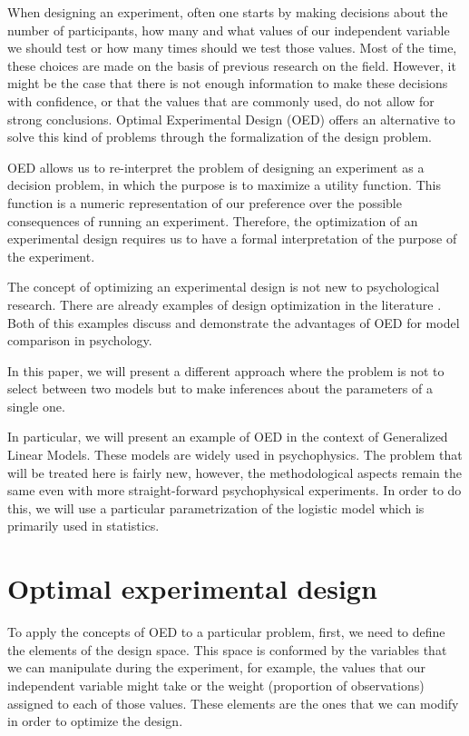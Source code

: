 \documentclass[preprint,review,12pt]{elsarticle}
\begin{document}
When designing an experiment, often one starts by making decisions about the number of participants, how many and what values of our independent variable we should test or how many times should we test those values. Most of the time, these choices are made on the basis of previous research on the field. However, it might be the case that there is not enough information to make these decisions with confidence, or that the values that are commonly used, do not allow for strong conclusions. Optimal Experimental Design (OED) offers an alternative to solve this kind of problems through the formalization of the design problem.

OED allows us to re-interpret the problem of designing an experiment as a decision problem, in which the purpose is to maximize a utility function. This function is a numeric representation of our preference over the possible consequences of running an experiment. Therefore, the optimization of an experimental design requires us to have a formal interpretation of the purpose of the experiment.

The concept of optimizing an experimental design is not new to psychological research. There are already examples of design optimization in the literature \citep[e.g.][]{Myung2009,ZL2010}. Both of this examples discuss and demonstrate the advantages of OED for model comparison in psychology. 

In this paper, we will present a different approach where the problem is not to select between two models but to make inferences about the parameters of a single one.

In particular, we will present an example of OED in the context of Generalized Linear Models. These models are widely used in psychophysics. The problem that will be treated here is fairly new, however, the methodological aspects remain the same even with more straight-forward psychophysical experiments. In order to do this, we will use a particular parametrization of the logistic model which is primarily used in statistics.

\section{Optimal experimental design}

To apply the concepts of OED to a particular problem, first, we need to define the elements of the design space. This space is conformed by the variables that we can manipulate during the experiment, for example, the values that our independent variable might take or the weight (proportion of observations) assigned to each of those values. These elements are the ones that we can modify in order to optimize the design.
\end{document}
